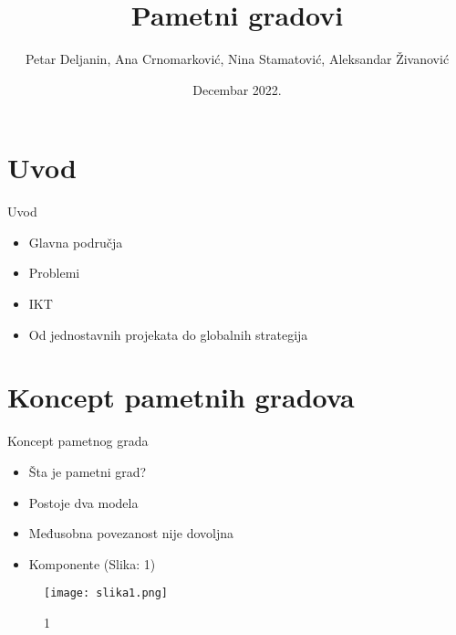 \documentclass{beamer}
\title{Pametni gradovi}
\author{Petar Deljanin, Ana Crnomarković, Nina Stamatović, Aleksandar Živanović }
\date{Decembar 2022.}
\begin{document}
\maketitle

\section{Uvod}

\begin{frame}{Uvod}
\begin{itemize}
    \item{Glavna područja}
    \item{Problemi}
    \item{IKT}
    \item{Od jednostavnih projekata do globalnih strategija}
\end{itemize}
\end{frame}

\section{Koncept pametnih gradova}

\begin{frame}{Koncept pametnog grada}
\begin{itemize}
    \item{Šta je pametni grad?} 
    \item{Postoje dva modela}
    \item{Međusobna povezanost nije dovoljna}
    \item{Komponente (Slika: 1)}
    
\end{itemize} 
\begin{figure}
    \centering
    \texttt{[image: slika1.png]}
    \caption{1}
    \label{Slika}
\end{figure}


\end{frame}
\end{document}
